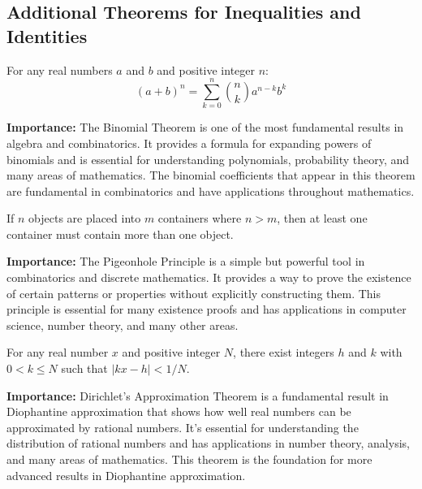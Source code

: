 \subsection*{Additional Theorems for Inequalities and Identities}

\begin{theorem}
For any real numbers $a$ and $b$ and positive integer $n$:
\[
(a + b)^n = \sum_{k=0}^n \binom{n}{k} a^{n-k} b^k
\]
\end{theorem}

\noindent\textbf{Importance:} The Binomial Theorem is one of the most fundamental results in algebra and combinatorics. It provides a formula for expanding powers of binomials and is essential for understanding polynomials, probability theory, and many areas of mathematics. The binomial coefficients that appear in this theorem are fundamental in combinatorics and have applications throughout mathematics.



\begin{theorem}
If $n$ objects are placed into $m$ containers where $n > m$, then at least one container must contain more than one object.
\end{theorem}

\noindent\textbf{Importance:} The Pigeonhole Principle is a simple but powerful tool in combinatorics and discrete mathematics. It provides a way to prove the existence of certain patterns or properties without explicitly constructing them. This principle is essential for many existence proofs and has applications in computer science, number theory, and many other areas.



\begin{theorem}
For any real number $x$ and positive integer $N$, there exist integers $h$ and $k$ with $0 < k \leq N$ such that $|kx - h| < 1/N$.
\end{theorem}

\noindent\textbf{Importance:} Dirichlet's Approximation Theorem is a fundamental result in Diophantine approximation that shows how well real numbers can be approximated by rational numbers. It's essential for understanding the distribution of rational numbers and has applications in number theory, analysis, and many areas of mathematics. This theorem is the foundation for more advanced results in Diophantine approximation.





